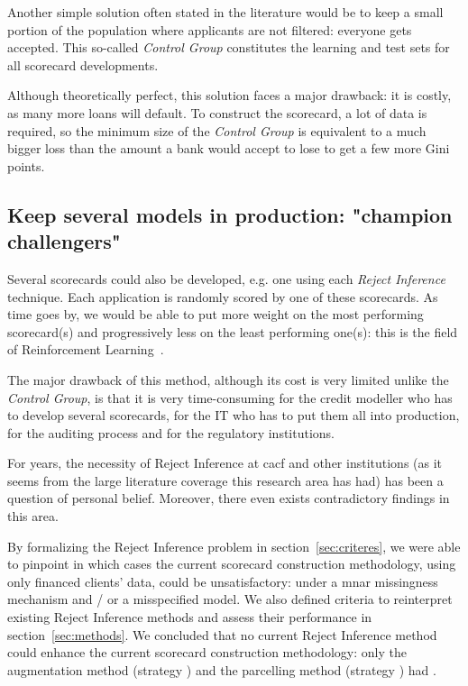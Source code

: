 Another simple solution often stated in the literature would be to keep a small portion of the population where applicants are not filtered: everyone gets accepted. This so-called \textit{Control Group} constitutes the learning and test sets for all scorecard developments.

Although theoretically perfect, this solution faces a major drawback: it is costly, as many more loans will default. To construct the scorecard, a lot of data is required, so the minimum size of the \textit{Control Group} is equivalent to a much bigger loss than the amount a bank would accept to lose to get a few more Gini points.

\subsection{Keep several models in production: "champion challengers"}

Several scorecards could also be developed, e.g. one using each \textit{Reject Inference} technique. Each application is randomly scored by one of these scorecards. As time goes by, we would be able to put more weight on the most performing scorecard(s) and progressively less on the least performing one(s): this is the field of Reinforcement Learning~\cite{}.

The major drawback of this method, although its cost is very limited unlike the \textit{Control Group}, is that it is very time-consuming for the credit modeller who has to develop several scorecards, for the IT who has to put them all into production, for the auditing process and for the regulatory institutions.

\bigskip

For years, the necessity of {Reject Inference} at \gls{cacf} and other institutions (as it seems from the large literature coverage this research area has had) has been a question of personal belief. Moreover, there even exists contradictory findings in this area.

By formalizing the {Reject Inference} problem in section~\ref{sec:criteres}, we were able to pinpoint in which cases the current scorecard construction methodology, using only financed clients' data, could be unsatisfactory: under a \gls{mnar} missingness mechanism and / or a misspecified model. We also defined criteria to reinterpret existing {Reject Inference} methods and assess their performance in section~\ref{sec:methods}. We concluded that no current {Reject Inference} method could enhance the current scorecard construction methodology: only the augmentation method (strategy ) and the parcelling method (strategy ) had .

